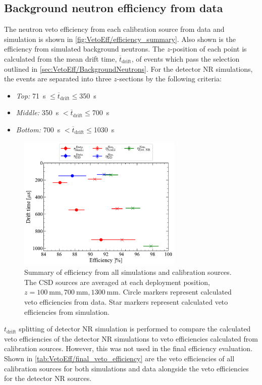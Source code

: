 \subsection{Background neutron efficiency from data}\label{sec:VetoEff/BkgNeutronEff}
The neutron veto efficiency from each calibration source from data and simulation is shown in \autoref{fig:VetoEff/efficiency_summary}. Also shown is the efficiency from simulated background neutrons.
The $z$-position of each point is calculated from the mean drift time, $\overline{t}_{\text{drift}}$, of events which pass the selection outlined in \autoref{sec:VetoEff/BackgroundNeutrons}.
For the detector NR simulations, the events are separated into three $z$-sections by the following criteria:
\begin{itemize}
    \item \textit{Top:} 71~\textmu s $\leq\overline{t}_{\text{drift}}\leq$350~\textmu s
    \item \textit{Middle:} 350~\textmu s $<\overline{t}_{\text{drift}}\leq$700~\textmu s
    \item \textit{Bottom:} 700~\textmu s $<\overline{t}_{\text{drift}}\leq$1030~\textmu s
\end{itemize}

\begin{figure}[!ht]
	\centering
	\includegraphics[width=0.7\textwidth]{figures/VetoEfficiency/SummaryPlot.pdf}
	\caption{Summary of efficiency from all simulations and calibration sources.
		The CSD sources are averaged at each deployment position, $z=100~\text{mm},700~\text{mm},1300~\text{mm}$.
		Circle markers represent calculated veto efficiencies from data.
		Star markers represent calculated veto efficiencies from simulation.}
	\label{fig:VetoEff/efficiency_summary}
\end{figure}
$t_{\text{drift}}$ splitting of detector NR simulation is performed to compare the calculated veto efficiencies of the detector NR simulations to veto efficiencies calculated from calibration sources. However, this was not used in the final efficiency evaluation. Shown in \autoref{tab:VetoEff/final_veto_efficiency} are the veto efficiencies of all calibration sources for both simulations and data alongside the veto efficiencies for the detector NR sources.

